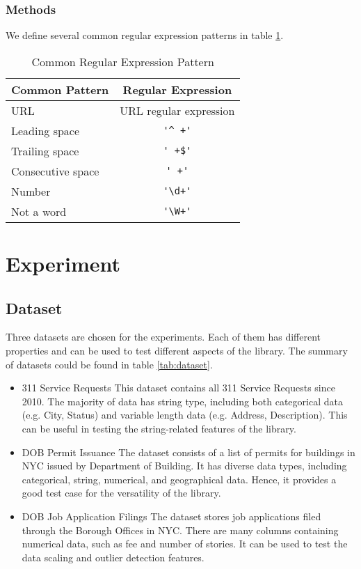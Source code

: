 \documentclass[sigconf]{acmart}
\begin{document}
\subsubsection{Methods}
We define several common regular expression patterns in table \ref{tab:reg}.
\begin{table}
\caption{Common Regular Expression Pattern}   
\label{tab:reg}
\begin{tabular}{lc}
	Common Pattern & Regular Expression \\
\hline
	URL & URL regular expression\cite{url} \\
	Leading space & \verb!'^ +'! \\
	Trailing space & \verb!' +$'! \\
	Consecutive space & \verb!' +'! \\
	Number & \verb!'\d+'!  \\
	Not a word & \verb!'\W+'! \\
\end{tabular}   
\end{table}


\section{Experiment}
\subsection{Dataset}
Three datasets are chosen for the experiments. Each of them has different properties and can be used to test different aspects of the library. The summary of datasets could be found in table \ref{tab:dataset}.
\begin{itemize}
	\item{311 Service Requests}\cite{nycopendata1} This dataset contains all 311 Service Requests since 2010. The majority of data has string type, including both categorical  data (e.g. City, Status) and variable length data (e.g. Address, Description). This can be useful in testing the string-related features of the library.
	\item{DOB Permit Issuance}\cite{nycopendata2} The dataset consists of a list of permits for buildings in NYC issued by Department of Building. It has diverse data types, including categorical, string, numerical, and geographical data. Hence, it provides a good test case for the versatility of the library. 
	\item{DOB Job Application Filings}\cite{nycopendata3} The dataset stores job applications filed through the Borough Offices in NYC. There are many columns containing numerical data, such as fee and number of stories. It can be used to test the data scaling and outlier detection features. 
\end{itemize}
\end{document}
